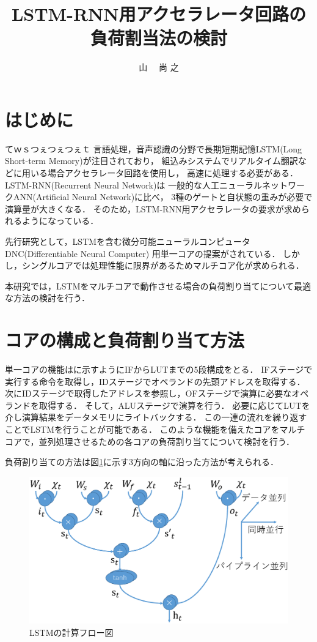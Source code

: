 \documentclass[a4j]{jarticle}
\title{LSTM-RNN用アクセラレータ回路の負荷割当法の検討}
\author{山 \UTF{FA11} ~~尚 之}
\begin{document}
\begin{Abstract}

 \section{はじめに}てｗｓつぇつぇつぇｔ
言語処理，音声認識の分野で長期短期記憶LSTM(Long Short-term Memory)が注目されており，
組込みシステムでリアルタイム翻訳などに用いる場合アクセラレータ回路を使用し，
高速に処理する必要がある．
LSTM-RNN(Recurrent Neural Network)は
一般的な人工ニューラルネットワークANN(Artificial Neural Network)に比べ，
3種のゲートと自状態の重みが必要で演算量が大きくなる．
そのため，LSTM-RNN用アクセラレータの要求が求められるようになっている．

先行研究として，LSTMを含む微分可能ニューラルコンピュータDNC(Differentiable Neural Computer)
用単一コアの提案がされている\cite{bib:pre-method}．
しかし，シングルコアでは処理性能に限界があるためマルチコア化が求められる．

本研究では，LSTMをマルチコアで動作させる場合の負荷割り当てについて最適な方法の検討を行う．



 \section{コアの構成と負荷割り当て方法}
単一コアの機能はに示すようにIFからLUTまでの5段構成をとる．
IFステージで実行する命令を取得し，IDステージでオペランドの先頭アドレスを取得する．
次にIDステージで取得したアドレスを参照し，OFステージで演算に必要なオペランドを取得する．
そして，ALUステージで演算を行う．
必要に応じてLUTを介し演算結果をデータメモリにライトバックする．
この一連の流れを繰り返すことでLSTMを行うことが可能である．
このような機能を備えたコアをマルチコアで，並列処理させるための各コアの負荷割り当てについて検討を行う．


 負荷割り当ての方法は図\ref{フロー図}に示す3方向の軸に沿った方法が考えられる．
 \begin{figure}[h]
  \centering
  \includegraphics[scale=0.25]{flow.eps}
  \caption{LSTMの計算フロー図}
  \label{フロー図}
 \end{figure}



\end{Abstract}
\end{document}
